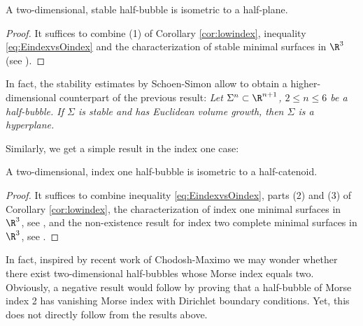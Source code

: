         	\begin{cor}\label{cor:stable}
        		A two-dimensional, stable half-bubble is isometric to a half-plane.	
        	\end{cor}	
        	
        	\begin{proof}
        		It suffices to combine (1) of Corollary \ref{cor:lowindex}, inequality \eqref{eq:EindexvsOindex} and the characterization of stable minimal surfaces in $\R^{3}$ (see \cite{dCP79,FCS80,Pog81}).
        	\end{proof}
        	
        	\begin{rmk}\label{rmk:higher-stable}
        	In fact, the stability estimates by Schoen-Simon allow to obtain a higher-dimensional counterpart of the previous result: \textsl{Let $\Sigma^n\subset\R^{n+1}$, $2\leqslant n\leqslant 6$ be a half-bubble. If $\Sigma$ is stable and has Euclidean volume growth, then $\Sigma$ is a hyperplane.}
        	\end{rmk}
        		
        	
        	
        	
        	Similarly, we get a simple result in the index one case:	
        	
        	\begin{cor}\label{cor:indexone}
        		A two-dimensional, index one half-bubble is isometric to a half-catenoid.	
        	\end{cor}	
        	
        	\begin{proof}
        		It suffices to combine inequality \eqref{eq:EindexvsOindex}, parts (2) and (3) of Corollary \ref{cor:lowindex}, the characterization of index one minimal surfaces in $\R^3$, see \cite{LR89}, and the non-existence result for index two complete minimal surfaces in $\R^3$, see \cite{CM14}.
        	\end{proof}
        	
        	In fact, inspired by recent work of Chodosh-Maximo \cite{CM14} we may wonder whether there exist two-dimensional half-bubbles whose Morse index equals two.
        	Obviously, a negative result would follow by proving that a half-bubble of Morse index 2 has vanishing Morse index with Dirichlet boundary conditions. Yet, this does not directly follow from the results above. 	
        	
